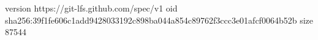 version https://git-lfs.github.com/spec/v1
oid sha256:39f1fe606c1add9428033192c898ba044a854c89762f3ccc3e01afcf0064b52b
size 87544

